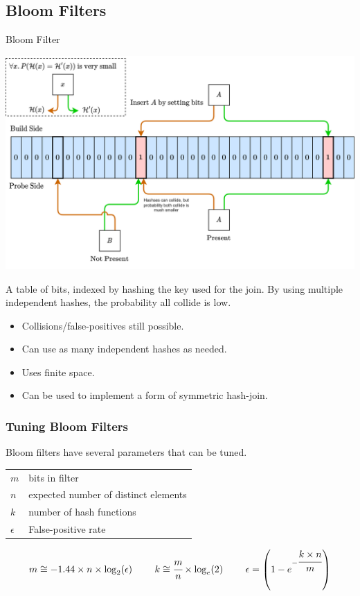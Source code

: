 \subsection{Bloom Filters}
\begin{definitionbox}{Bloom Filter}
    \begin{center}
        \includegraphics[width=\textwidth]{streams/images/bloom_filter.drawio.png}
    \end{center}
    A table of bits, indexed by hashing the key used for the join. By using multiple independent hashes, the probability all collide is low.
    \begin{itemize}
        \item Collisions/false-positives still possible.
        \item Can use as many independent hashes as needed.
        \item Uses finite space.
        \item Can be used to implement a form of symmetric hash-join.
    \end{itemize}
\end{definitionbox}
\subsubsection{Tuning Bloom Filters}
\noindent Bloom filters have several parameters that can be tuned.
\\ \begin{tabular}{l p{}}
    $m$        & bits in filter \\ 
    $n$        & expected number of distinct elements \\ 
    $k$        & number of hash functions \\ 
    $\epsilon$ & False-positive rate \\
\end{tabular}
\[\begin{matrix}
    m \cong -1.44 \times n \times \log_2(\epsilon) & \ &
    k \cong \cfrac{m}{n} \times \log_e(2) & \ &
    \epsilon  = \left( 1 - e^{-\cfrac{k \times n}{m}}\right) \\
\end{matrix}\]
